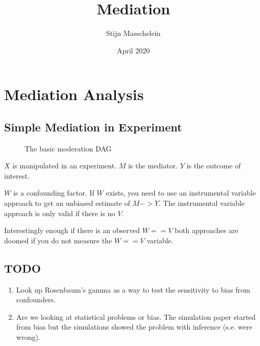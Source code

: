 \documentclass[]{article} %
\title{Mediation}
\author{Stijn Masschelein}
\date{April 2020}
\begin{document}
\maketitle

\section{Mediation Analysis}
\subsection{Simple Mediation in Experiment}


\begin{figure}    
\centering
{}
\caption{The basic moderation DAG} \label{basic}
\end{figure}


$X$ is manipulated in an experiment. $M$ is the mediator. $Y$ is the outcome of interest. 

$W$ is a confounding factor. If $W$ exists, you need to use an instrumental variable approach to get an unbiased estimate of $M -> Y$. The instrumental variable approach is only valid if there is no $V$.

Interestingly enough if there is an observed $W == V$ both approaches are doomed if you do not measure the $W == V$ variable.

\subsection{TODO}
\begin{enumerate}
    \item Look up Rosenbaum's gamma as a way to test the sensitivity to bias from confounders.
    \item Are we looking at statistical problems or bias. The simulation paper started from bias but the simulations showed the problem with inference (s.e. were wrong).
\end{enumerate}
\end{document}
